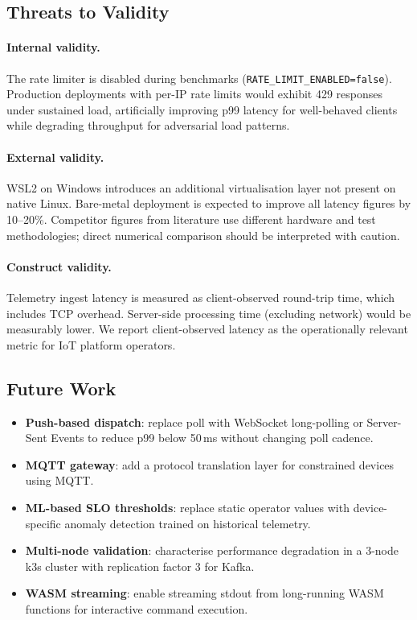 \documentclass[twocolumn,smallextended]{svjour3}
\begin{document}
\subsection{Threats to Validity}

\paragraph{Internal validity.}
The rate limiter is disabled during benchmarks (\texttt{RATE\_LIMIT\_ENABLED=false}).
Production deployments with per-IP rate limits would exhibit 429 responses
under sustained load, artificially improving p99 latency for well-behaved clients
while degrading throughput for adversarial load patterns.

\paragraph{External validity.}
WSL2 on Windows introduces an additional virtualisation layer not present on
native Linux. Bare-metal deployment is expected to improve all latency figures
by 10--20\%. Competitor figures from literature use different hardware and
test methodologies; direct numerical comparison should be interpreted with caution.

\paragraph{Construct validity.}
Telemetry ingest latency is measured as client-observed round-trip time,
which includes TCP overhead. Server-side processing time (excluding network)
would be measurably lower. We report client-observed latency as the operationally
relevant metric for IoT platform operators.

\subsection{Future Work}

\begin{itemize}
  \item \textbf{Push-based dispatch}: replace poll with WebSocket long-polling
    or Server-Sent Events to reduce p99 below 50\,ms without changing poll cadence.
  \item \textbf{MQTT gateway}: add a protocol translation layer for constrained
    devices using MQTT.
  \item \textbf{ML-based SLO thresholds}: replace static operator values with
    device-specific anomaly detection trained on historical telemetry.
  \item \textbf{Multi-node validation}: characterise performance degradation
    in a 3-node k3s cluster with replication factor 3 for Kafka.
  \item \textbf{WASM streaming}: enable streaming stdout from long-running
    WASM functions for interactive command execution.
\end{itemize}
\end{document}

